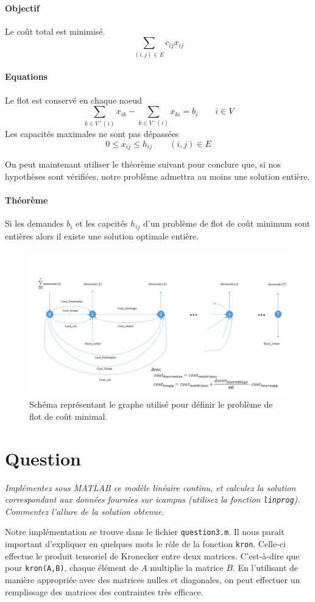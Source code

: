 \documentclass[12pt,oneside,a4paper]{article}
\newcommand{\question}
{
\addtocounter{section}{1}
\section*{Question \thesection}
}
\begin{document}
\paragraph{Objectif}
Le coût total est minimisé.
\[ \sum_{(i, j) \in E} c_{ij} x_{ij} \]
\paragraph{Equations} Le flot est conservé en chaque noeud
\[ \sum_{k \in V^{+}(i)} x_{ik} - \sum_{k \in V^{-}(i)} x_{ki} 
  = b_i \qquad i \in V
\]
Les capacités maximales ne sont pas dépassées
\[ 0 \leq x_{ij} \leq h_{ij} \qquad (i, j) \in E \]

On peut maintenant utiliser le théorème suivant pour conclure que, si nos hypothèses sont vérifiées, notre problème admettra au moins une solution entière.
\paragraph{Théorème}
Si les demandes $b_i$ et les capcités $h_{ij}$ d'un problème de flot de coût minimum sont entières alors il existe une solution optimale entière.

\begin{figure}[H]
	\centering
		\includegraphics[scale = 0.5]{Schema_flot.png}
	\caption{Schéma représentant le graphe utilisé pour définir 
  le problème de flot de coût minimal.}
	\label{fig:schemaFlot}
\end{figure}

\question %
\emph{Implémentez sous MATLAB ce modèle linéaire continu, 
et calculez la solution correspondant aux données fournies sur icampus 
(utilisez la fonction \texttt{linprog}). 
Commentez l'allure de la solution obtenue.}

Notre implémentation se trouve dans le fichier \texttt{question3.m}.
Il nous parait important d'expliquer en quelques mots le r\^ole
de la fonction \texttt{kron}.
Celle-ci effectue le produit tensoriel de Kronecker entre deux matrices.
C'est-à-dire que pour \texttt{kron(A,B)},
chaque élément de $A$ multiplie la matrice $B$.
En l'utilisant de manière appropriée avec des matrices nulles et diagonales,
on peut effectuer un remplissage des matrices des contraintes très efficace. 
\end{document}
